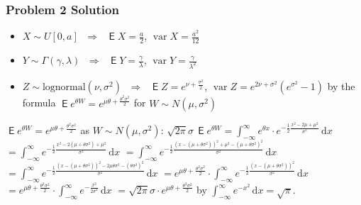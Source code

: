 \documentclass[10pt,handout]{beamer}
\newcommand{\ds}{\displaystyle}
\newcommand{\ie}{\;\Longrightarrow\;}
\DeclareMathOperator\expc{\mathsf{E}}
\DeclareMathOperator\var{var}
\theoremstyle{definition}
\begin{document}
\begin{frame}[allowframebreaks]
  \frametitle{Problem 2 Solution}
  \begin{itemize}
    \item $X\sim U[0, a]$ $\ie$ $\ds\expc X = \frac{a}{2}$, $\ds\var X = \frac{a^2}{12}$ 
    \item $Y\sim \Gamma(\gamma, \lambda)$ $\ie$ $\ds\expc Y = \frac{\gamma}{\lambda}$, $\ds\var Y = \frac{\gamma}{\lambda^2}$
    \item $Z\sim\text{lognormal}(\nu,\sigma^2)$ $\ie$ $\ds\expc Z = e^{\nu + \frac{\sigma^2}{2}}$, $\ds\var Z = e^{2\nu + \sigma^2}(e^{\sigma^2} - 1)$ by the formula $\ds\expc{e^{\theta W}} = e^{\mu\theta + \frac{\theta^2\sigma^2}{2}}$ for $W\sim N(\mu, \sigma^2)$     
  \end{itemize}
  $\ds\expc{e^{\theta W}} = e^{\mu\theta + \frac{\theta^2\sigma^2}{2}}$ as $W\sim N(\mu, \sigma^2)$: $\ds\sqrt{2\pi}\sigma\,\expc{e^{\theta W}} = \int_{-\infty}^\infty e^{\theta x}\cdot e^{-\frac{1}{2}\frac{x^2 - 2\mu + \mu^2}{\sigma^2}}\,\text{d}x$ $\ds = \int_{-\infty}^\infty e^{-\frac{1}{2}\frac{x^2 - 2(\mu + \theta\sigma^2) + \mu^2}{\sigma^2}}\,\text{d}x$ $\ds = \int_{-\infty}^\infty e^{-\frac{1}{2}\frac{(x - (\mu + \theta\sigma^2))^2 + \mu^2 - (\mu + \theta\sigma^2)^2}{\sigma^2}}\,\text{d}x$ $\ds = \int_{-\infty}^\infty e^{-\frac{1}{2}\frac{(x - (\mu + \theta\sigma^2))^2 - 2\mu\theta\sigma^2 - (\theta\sigma^2)^2}{\sigma^2}}\,\text{d}x$ $\ds = e^{\mu\theta + \frac{\theta^2\sigma^2}{2}}\cdot\int_{-\infty}^\infty e^{-\frac{1}{2}\frac{(x - (\mu + \theta\sigma^2))^2}{\sigma^2}}\,\text{d}x$ $\ds = e^{\mu\theta + \frac{\theta^2\sigma^2}{2}}\cdot\int_{-\infty}^\infty e^{-\frac{x^2}{2\sigma^2}}\,\text{d}x$ $\ds = \sqrt{2\pi}\sigma\cdot e^{\mu\theta + \frac{\theta^2\sigma^2}{2}}$ by $\ds\int_{-\infty}^{\infty}e^{-x^2}\,\text{d}x = \sqrt{\pi}$.


\end{frame}
\end{document}

